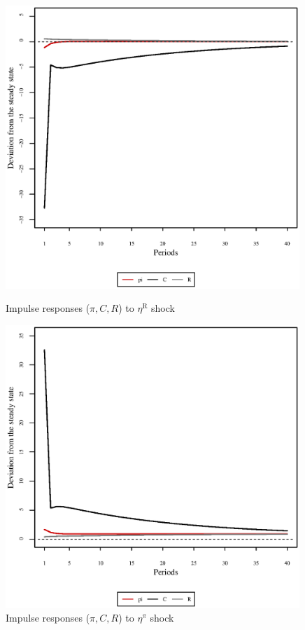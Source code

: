 \begin{figure}[h]
\begin{minipage}{0.5\textwidth}
\vspace*{-3em}
\centering
\includegraphics[width=0.99\textwidth, scale=0.55]{plots/plot_138.eps}
\caption{Impulse responses ($\pi, C, R$) to $\eta^{\mathrm{R}}$ shock}
\end{minipage}
\begin{minipage}{0.5\textwidth}
\vspace*{-3em}
\centering
\includegraphics[width=0.99\textwidth, scale=0.55]{plots/plot_139.eps}
\caption{Impulse responses ($\pi, C, R$) to $\eta^{\pi}$ shock}
\end{minipage}
\end{figure}

